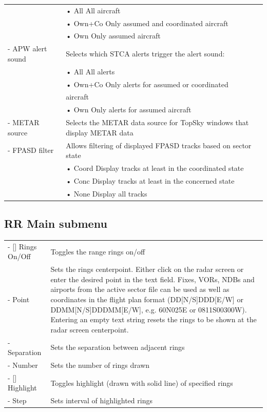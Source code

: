 \documentclass[11pt,a4paper,oldfontcommands]{memoir}
\begin{document}
\begin{tabular}{p{5cm} p{9cm}}
                          & \hspace{10pt}• All All aircraft\\
                          & \hspace{10pt}• Own+Co Only assumed and coordinated aircraft\\
                          & \hspace{10pt}• Own Only assumed aircraft\\
- APW alert sound         & Selects which STCA alerts trigger the alert sound:\\
                          & \hspace{10pt}• All All alerts\\
                          & \hspace{10pt}• Own+Co Only alerts for assumed or coordinated\\
                          & aircraft\\
                          & \hspace{10pt}• Own Only alerts for assumed aircraft\\
- METAR source            & Selects the METAR data source for TopSky windows that display METAR data\\
- FPASD filter            & Allows filtering of displayed FPASD tracks based on sector state\\
                          & \hspace{10pt}• Coord Display tracks at least in the coordinated state\\
                          & \hspace{10pt}• Conc Display tracks at least in the concerned state\\
                          & \hspace{10pt}• None Display all tracks\\
\end{tabular}
\medskip

\subsection*{RR Main submenu}
\begin{tabular}{l l}
    - [] Rings On/Off & Toggles the range rings on/off\\
    - Point & Sets the rings centerpoint. Either click on the radar screen or enter the desired point in the text field. Fixes, VORs, NDBs and airports from the active sector file can be used as well as coordinates in the flight plan format (DD[N/S]DDD[E/W] or DDMM[N/S]DDDMM[E/W], e.g. 60N025E or 0811S00300W). Entering an empty text string resets the rings to be shown at the radar screen centerpoint.\\
    - Separation & Sets the separation between adjacent rings\\
    - Number & Sets the number of rings drawn\\
    - [] Highlight & Toggles highlight (drawn with solid line) of specified rings\\
    - Step & Sets interval of highlighted rings\\
\end{tabular}
\end{document}
